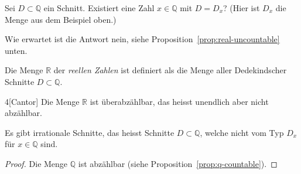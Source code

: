 \documentclass[../main.tex]{subfiles}
\begin{document}
\begin{question}
  Sei $D \subset \mathbb Q$ ein Schnitt. Existiert
  eine Zahl $x \in \mathbb Q$ mit $D = D_{x}$?
  (Hier ist $D_{x}$ die Menge aus dem Beispiel oben.)
\end{question}

Wie erwartet ist die Antwort nein, siehe Proposition~\ref{prop:real-uncountable} unten.

\begin{definition}
  Die Menge $\mathbb R$ der \textit{reellen Zahlen} ist definiert als die Menge
  aller Dedekindscher Schnitte $D \subset \mathbb Q$.
\end{definition}

\begin{manualproposition}{4}[Cantor]\label{prop:real-uncountable}
  Die Menge $\mathbb R$ ist überabzählbar, das heisst unendlich
  aber nicht abzählbar.
\end{manualproposition}

\begin{corollary}
  Es gibt irrationale Schnitte, das heisst Schnitte $D \subset \mathbb Q$,
  welche nicht vom Typ $D_{x}$ für $x \in \mathbb Q$ sind.
\end{corollary}

\begin{proof}
  Die Menge $\mathbb Q$ ist abzählbar (siehe Proposition~\ref{prop:q-countable}).
\end{proof}
\end{document}
